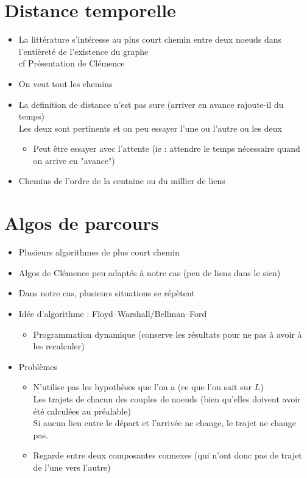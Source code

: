 \documentclass{article}
\begin{document}
\section*{Distance temporelle}
\begin{itemize}
	\item La littérature s'intéresse au plus court chemin entre deux noeuds dans l'entièreté de l'existence du graphe \\
	cf Présentation de Clémence
	\item On veut tout les chemins
	\item La definition de distance n'est pas sure (arriver en avance rajoute-il du temps) \\
	Les deux sont pertinents et on peu essayer l'une ou l'autre ou les deux
	\begin{itemize}
		\item[$\rightarrow$] Peut être essayer avec l'attente (ie : attendre le temps nécessaire quand on arrive en "avance")
	\end{itemize}
	\item Chemins de l'ordre de la centaine ou du millier de liens
\end{itemize}

\section*{Algos de parcours}
\begin{itemize}
	\item Plusieurs algorithmes de plus court chemin
	\item Algos de Clémence peu adaptés à notre cas (peu de liens dans le sien)
	\item Dans notre cas, plusieurs situations se répètent
	\item Idée d'algorithme : Floyd–Warshall/Bellman–Ford
	\begin{itemize}
		\item Programmation dynamique (conserve les résultats pour ne pas à avoir à les recalculer)
	\end{itemize}
	\item Problèmes
	\begin{itemize}
		\item N'utilise pas les hypothèses que l'on a (ce que l'on sait sur $L$) \\
		Les trajets de chacun des couples de noeuds (bien qu'elles doivent avoir été calculées au préalable) \\
		Si aucun lien entre le départ et l'arrivée ne change, le trajet ne change pas.
		\item Regarde entre deux composantes connexes (qui n'ont donc pas de trajet de l'une vers l'autre)
	\end{itemize}
\end{itemize}
\end{document}
